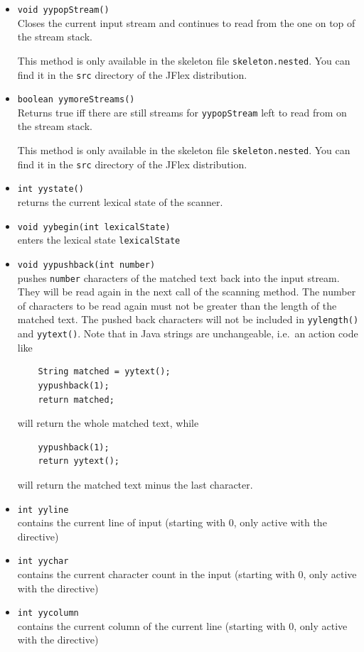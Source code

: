 \documentclass[11pt]{scrartcl}
\begin{document}
\begin{itemize}
\item \texttt{void yypopStream()}\\
  Closes the current input stream and continues to
  read from the one on top of the stream stack.

  This method is only available in the skeleton file
  \texttt{skeleton.nested}. You can find it in the 
  \texttt{src} directory of the JFlex distribution.

\item \texttt{boolean yymoreStreams()}\\
  Returns true iff there are still streams for \texttt{yypopStream} 
  left to read from on the stream stack.

  This method is only available in the skeleton file
  \texttt{skeleton.nested}. You can find it in the 
  \texttt{src} directory of the JFlex distribution. 

\item \texttt{int yystate()}\\
  returns the current lexical state of the scanner.

\item \texttt{void yybegin(int lexicalState)}\\
  enters the lexical state \texttt{lexicalState}

\item \texttt{void yypushback(int number)}\\
  pushes \texttt{number} characters of the matched text back into the input stream. 
  They will be read again in the next call of the scanning method. 
  The number of characters to be read again must not be greater than the length
  of the matched text. The pushed back characters will not be included in \texttt{yylength()} and \texttt{yytext()}.
  Note that in Java strings are unchangeable, i.e.\ an action code like
  \begin{verbatim}
    String matched = yytext();
    yypushback(1);
    return matched;
  \end{verbatim}
  will return the whole matched text, while    
  \begin{verbatim}
    yypushback(1);
    return yytext();
  \end{verbatim}
  will return the matched text minus the last character.

\item\texttt{int yyline}\\
  contains the current line of input (starting with 0, only active with
  the \texttt{} directive)

\item \texttt{int yychar}\\
  contains the current character count in the input (starting with 0,
  only active with the \texttt{} directive)

\item \texttt{int yycolumn}\\
  contains the current column of the current line (starting with 0, only
  active with the \texttt{} directive)

\end{itemize}
\end{document}

